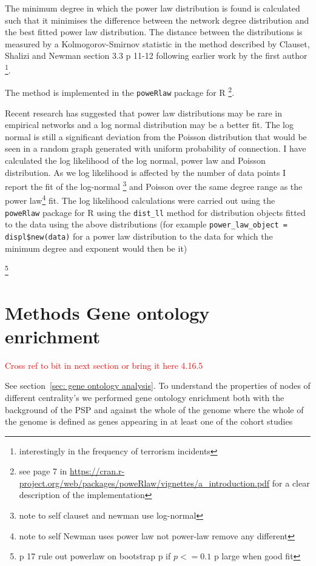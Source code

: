 The minimum degree in which the power law distribution is found is calculated such that it minimises the difference between the network degree distribution and the best fitted power law distribution. The distance between the distributions is measured by a Kolmogorov-Smirnov statistic in the method described by Clauset, Shalizi and Newman \cite{clauset2009power} section 3.3 p 11-12  following earlier work by the first author \cite{clauset2007frequency} \footnote{interestingly in the frequency of terrorism incidents}. 

The method is implemented in the \texttt{poweRlaw} package for R \cite{gillespie2015fitting}\footnote{see page 7 in \url{https://cran.r-project.org/web/packages/poweRlaw/vignettes/a_introduction.pdf} for a clear description of the implementation}.

Recent research has suggested that power law distributions may be rare in empirical networks and a log normal distribution may be a better fit. The log normal is still a significant deviation from the Poisson distribution that would be seen in a random graph generated with uniform probability of connection. I have calculated the log likelihood of the log normal, power law and Poisson distribution. As we log likelihood is affected by the number of data points I report the fit of the log-normal \footnote{note to self clauset and newman use log-normal} and Poisson over the same degree range as the power law\footnote{note to self Newman uses power law not power-law remove any different} fit. The log likelihood calculations were carried out using the \texttt{poweRlaw} package for R \cite{gillespie2015fitting} using the \texttt{dist\_ll} method for distribution objects fitted to the data using the above distributions (for example \texttt{power\_law\_object = displ\$new(data)} for a power law distribution to the data for which the minimum degree and exponent would then be it) 

\footnote{p 17 rule out powerlaw on bootstrap p if $p<=0.1$ p large when good fit}


\section{Methods Gene ontology enrichment}
\label{sec:Methods gene ontology centrality}
\textcolor{red}{Cross ref to bit in next section or bring it here 4.16.5}  

See section~\ref{sec: gene ontology analysis}.
To understand the properties of nodes of different centrality's we performed gene ontology enrichment both with the background of the PSP and against the whole of the genome where the whole of the genome is defined as genes appearing in at least one of the cohort studies 


